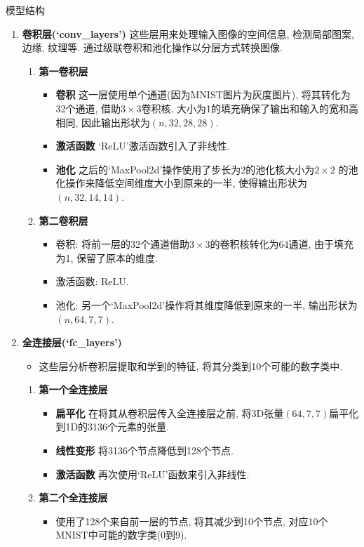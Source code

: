 \documentclass{beamer}
\begin{document}
\begin{frame}[fragile]{模型结构}
	\begin{enumerate}
		\item<only@1> \textbf{卷积层(`conv\_layers')}
			这些层用来处理输入图像的空间信息, 检测局部图案, 边缘, 纹理等. 通过级联卷积和池化操作以分层方式转换图像.
			\begin{enumerate}
				\item \textbf{第一卷积层}
				      \begin{itemize}
					      \item \textbf{卷积 } 这一层使用单个通道(因为MNIST图片为灰度图片), 将其转化为32个通道, 借助$3\times 3$卷积核. 大小为1的填充确保了输出和输入的宽和高相同, 因此输出形状为$(n,32,28,28)$.
					      \item \textbf{激活函数 } `ReLU'激活函数引入了非线性.
					      \item \textbf{池化 } 之后的`MaxPool2d'操作使用了步长为2的池化核大小为$2\times 2$
					            的池化操作来降低空间维度大小到原来的一半, 使得输出形状为$(n,32,14,14)$.
				      \end{itemize}
				\item \textbf{第二卷积层}
				      \begin{itemize}
					      \item 卷积: 将前一层的32个通道借助$3\times 3$的卷积核转化为64通道, 由于填充为1, 保留了原本的维度.
					      \item 激活函数: ReLU.
					      \item 池化: 另一个`MaxPool2d'操作将其维度降低到原来的一半, 输出形状为$(n,64,7,7)$.
				      \end{itemize}
			\end{enumerate}
		\item<only@2> \textbf{全连接层(`fc\_layers')}
			\begin{itemize}
				\item 这些层分析卷积层提取和学到的特征, 将其分类到10个可能的数字类中.
			\end{itemize}
			\begin{enumerate}
				\item \textbf{第一个全连接层 }
				      \begin{itemize}
					      \item \textbf{扁平化} 在将其从卷积层传入全连接层之前, 将3D张量$(64,7,7)$扁平化到1D的3136个元素的张量.
					      \item \textbf{线性变形 } 将3136个节点降低到128个节点.
					      \item \textbf{激活函数 } 再次使用`ReLU'函数来引入非线性.
				      \end{itemize}
				\item \textbf{第二个全连接层 }
				      \begin{itemize}
					      \item 使用了128个来自前一层的节点, 将其减少到10个节点, 对应10个MNIST中可能的数字类(0到9).
				      \end{itemize}
			\end{enumerate}
	\end{enumerate}
\end{frame}
\end{document}
